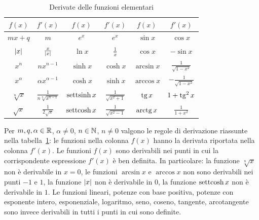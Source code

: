 \begin{table}
  \begin{tabular}{c|c||c|c||c|c}
    $f(x)$ & $f'(x)$ & $f(x)$ & $f'(x)$ & $f(x)$ & $f'(x)$
    \\\hline
    $mx + q$ & $m$ &
    $e^x$ & $e^x$ &
    $\sin x$ & $\cos x$ \\
    ${\left|x\right|}$ & $\frac{x}{{\left|x\right|}}$ &
    $\ln x$ & $\frac 1 x$ &
    $\cos x$ & $-\sin x$ \\
    $x^n$ & $n x^{n-1}$ &
    $\sinh x$ & $\cosh x$ &
    $\arcsin x$ & $\frac{1}{\sqrt{1-x^2}}$ \\
    $x^\alpha$ & $\alpha x^{\alpha -1}$ &
    $\cosh x$ & $\sinh x$ & $\arccos x$ & $-\frac{1}{\sqrt{1-x^2}}$ \\
    $\sqrt[n]{x}$ & $\frac{1}{n\sqrt[n]{x^{n-1}}}$ &
    $\operatorname{settsinh} x$ & $\frac{1}{\sqrt{x^2+1}}$ &
    $\operatorname{tg} x$ & $1+ \operatorname{tg}^2 x$ \\
    $\sqrt{x}$ & $\frac{1}{2\sqrt{x}}$ &
    $\operatorname{settcosh} x$ & $\frac{1}{\sqrt{x^2-1}}$ &
    $\operatorname{arctg} x$ & $\frac{1}{1+x^2}$
  \end{tabular}
  \caption{Derivate delle funzioni elementari}
  \label{tab:derivate}%
\end{table}

\begin{theorem}%
\label{th:derivate_elementari}%
%
\mymark{**}%
Per $m,q,\alpha \in {\mathbb R}$, $\alpha \neq 0$, $n\in {\mathbb N}$, $n\neq 0$
valgono le regole di derivazione riassunte nella
tabella~\ref{tab:derivate}: le funzioni nella colonna
$f(x)$ hanno la derivata riportata nella colonna $f'(x)$.
Le funzioni $f(x)$ sono derivabili nei punti in cui la
corrispondente espressione $f'(x)$ è ben definita.
In particolare:
la funzione $\sqrt[n]{x}$
non è derivabile in $x=0$,
le funzioni $\arcsin x$ e $\arccos x$ non sono derivabili nei punti $-1$ e $1$,
la funzione ${\left|x\right|}$ non è derivabile in $0$,
la funzione $\operatorname{settcosh} x$ non è derivabile in $1$.
Le funzioni lineari, potenze con base positiva, potenze con esponente intero,
esponenziale, logaritmo, seno, coseno, tangente, arcotangente sono invece derivabili
in tutti i punti in cui sono definite.
\end{theorem}

